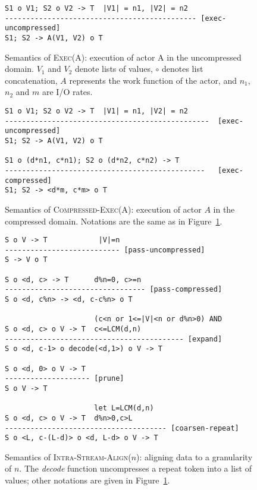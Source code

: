 \begin{figure}[t]
\scriptsize
\begin{verbatim}
S1 o V1; S2 o V2 -> T  |V1| = n1, |V2| = n2
--------------------------------------------- [exec-uncompressed]
S1; S2 -> A(V1, V2) o T
\end{verbatim}
\caption{Semantics of \textsc{Exec(A)}: execution of actor A in the
uncompressed domain.  $V_1$ and $V_2$ denote lists of values, $\circ$
denotes list concatenation, $A$ represents the work function of the
actor, and $n_1$, $n_2$ and $m$ are I/O rates.
\protect\label{fig:exec-rule}}
\end{figure}

\begin{figure}[t]
\scriptsize
\begin{verbatim}
S1 o V1; S2 o V2 -> T  |V1| = n1, |V2| = n2
------------------------------------------------  [exec-uncompressed]
S1; S2 -> A(V1, V2) o T

S1 o (d*n1, c*n1); S2 o (d*n2, c*n2) -> T
-----------------------------------------------   [exec-compressed]
S1; S2 -> <d*m, c*m> o T
\end{verbatim}

\caption{Semantics of \textsc{Compressed-Exec(A)}: execution of actor
$A$ in the compressed domain.  Notations are the same as in
Figure~\ref{fig:exec-rule}.  \protect\label{fig:compressed-exec-rule}}
\end{figure}

\begin{figure}[t]
\scriptsize
\begin{verbatim}
S o V -> T            |V|=n
--------------------------- [pass-uncompressed]
S -> V o T

S o <d, c> -> T      d%n=0, c>=n
--------------------------------- [pass-compressed]
S o <d, c%n> -> <d, c-c%n> o T

                     (c<n or 1<=|V|<n or d%n>0) AND
S o <d, c> o V -> T  c<=LCM(d,n)
------------------------------------------ [expand]
S o <d, c-1> o decode(<d,1>) o V -> T

S o <d, 0> o V -> T
-------------------- [prune]
S o V -> T

                     let L=LCM(d,n)
S o <d, c> o V -> T  d%n>0,c>L
-------------------------------------- [coarsen-repeat]
S o <L, c-(L-d)> o <d, L-d> o V -> T

\end{verbatim}
\caption{Semantics of \textsc{Intra-Stream-Align}($n$): aligning data
to a granularity of $n$.  The \mbox{\it decode} function uncompresses
a repeat token into a list of values; other notations are given in
Figure~\ref{fig:exec-rule}. \protect\label{fig:intra-stream-align}}
\end{figure}

